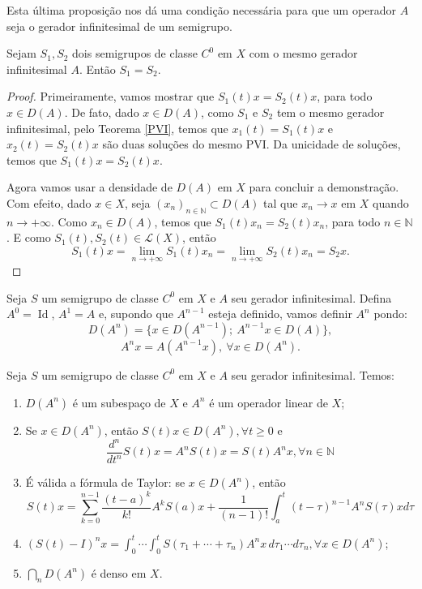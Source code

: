 \begin{remark}
    Esta última proposição nos dá uma condição necessária para que um operador $A$ seja o gerador infinitesimal de um semigrupo.
\end{remark}

\begin{proposition}[Unicidade]
Sejam $S_1,S_2$ dois semigrupos de classe $C^0$ em $X$ com o mesmo gerador infinitesimal $A$. Então $S_1=S_2$.
\end{proposition}
\begin{proof}
   Primeiramente, vamos mostrar que $S_1(t)x=S_2(t)x$, para todo $x\in D(A)$.
De fato, dado $x\in D(A)$, como $S_1$ e $S_2$ tem o mesmo gerador infinitesimal,  pelo Teorema \ref{PVI}, temos que $x_1(t)=S_1(t)x$ e $x_2(t)=S_2(t)x$ são duas soluções do mesmo PVI. Da unicidade de soluções, temos que $S_1(t)x=S_2(t)x$.

Agora vamos usar a densidade de $D(A)$ em $X$ para concluir a demonstração. Com efeito, dado $x\in X$, seja $(x_n)_{n\in \mathbb{N}}\subset D(A)$ tal que $x_n\to x$ em $X$ quando $n\to +\infty$. Como   $x_n\in D(A)$, temos que $S_1(t)x_n=S_2(t)x_n$, para todo $n\in \mathbb{N}$. E como  $S_1(t),S_2(t)\in \mathcal{L}(X)$, então
\[S_1(t)x=\lim_{n\to +\infty}S_1(t)x_n=\lim_{n\to +\infty}S_2(t)x_n=S_2x.\]
\end{proof}

\begin{definition}
    Seja $S$ um semigrupo de classe $C^0$ em $X$ e $A$ seu gerador infinitesimal. Defina $A^0=\operatorname{Id}$, $A^1=A$ e, supondo que $A^{n-1}$ esteja definido, vamos definir $A^n$ pondo:
\[D(A^n)=\{x\in D(A^{n-1});\ A^{n-1}x\in D(A)\},\]
\[A^nx=A(A^{n-1}x), \ \forall x\in D(A^{n}).\]
\end{definition}

\begin{proposition}
Seja   $S$ um semigrupo de classe $C^0$ em $X$ e $A$ seu gerador infinitesimal. Temos:

\begin{enumerate}[$(i)$]
 \item $D\left(A^n\right)$ é um subespaço de $X$ e $A^n$ é um operador linear de $X$;

 \item Se $x \in {D}\left(A^n\right)$, então $S(t) x \in {D}\left(A^n\right), \forall t \geq 0$ e
\begin{equation}\label{id-dern}
\frac{d^n}{d t^n} S(t) x=A^n S(t) x=S(t) A^n x, \forall n \in \mathbb{N}
\end{equation}
\item É válida a fórmula de Taylor: se $x \in {D}\left(A^n\right)$, então
\[
S(t) x=\sum_{k=0}^{n-1} \frac{(t-a)^k}{k!} A^k S(a) x+\frac{1}{(n-1)!} \int_a^t(t-\tau)^{n-1} A^n S(\tau) x d \tau
\]
\item  $(S(t)-I)^n x=\displaystyle\int_0^t \cdots \int_0^t S\left(\tau_1+\cdots+\tau_n\right) A^n x\, d \tau_1 \cdots d \tau_n, \forall x \in D\left(A^n\right)$;
\item $\displaystyle\bigcap_n {D}\left(A^n\right)$ é denso em $X$.
\end{enumerate}
\end{proposition}

